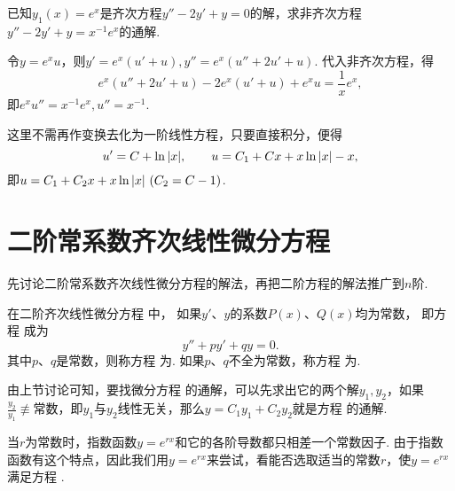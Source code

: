 \begin{example}
已知\(y_1(x) = e^x\)是齐次方程\(y'' - 2y' + y = 0\)的解，求非齐次方程\(y'' - 2y' + y = x^{-1} e^x\)的通解.
\begin{solution}
令\(y = e^x u\)，则\(y' = e^x (u'+u), y'' = e^x (u''+2u'+u)\).
代入非齐次方程，得\[
e^x (u''+2u'+u) - 2e^x (u'+u) + e^x u = \frac{1}{x} e^x,
\]即\(e^x u'' = x^{-1} e^x, u'' = x^{-1}\).

这里不需再作变换去化为一阶线性方程，只要直接积分，便得\[
u' = C + \ln\abs{x},
\qquad
u = C_1 + C x + x\ln\abs{x} - x,
\]即\(u = C_1 + C_2 x + x \ln\abs{x}\ (C_2=C-1)\).
\end{solution}
\end{example}

\section{二阶常系数齐次线性微分方程}\label{section:微分方程.常系数齐次线性微分方程}
先讨论二阶常系数齐次线性微分方程的解法，再把二阶方程的解法推广到\(n\)阶.

\begin{definition}
在二阶齐次线性微分方程  中，%
如果\(y'\)、\(y\)的系数\(P(x)\)、\(Q(x)\)均为常数，%
即方程  成为
\begin{equation}\label{equation:微分方程.二阶常系数齐次线性微分方程的一般形式}
y''+py'+qy=0.
\end{equation}
其中\(p\)、\(q\)是常数，则称方程  为.
如果\(p\)、\(q\)不全为常数，称方程  为.
\end{definition}

由上节讨论可知，要找微分方程  的通解，可以先求出它的两个解\(y_1, y_2\)，如果\(\frac{y_2}{y_1} \not\equiv \text{常数}\)，即\(y_1\)与\(y_2\)线性无关，那么\(y = C_1 y_1 + C_2 y_2\)就是方程  的通解.

当\(r\)为常数时，指数函数\(y = e^{r x}\)和它的各阶导数都只相差一个常数因子.
由于指数函数有这个特点，因此我们用\(y = e^{rx}\)来尝试，看能否选取适当的常数\(r\)，使\(y = e^{rx}\)满足方程 .

